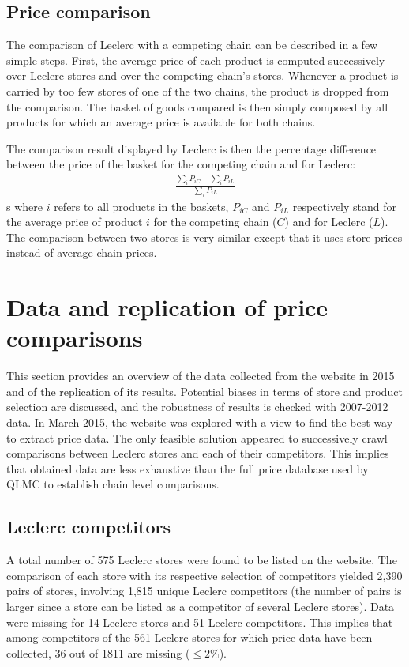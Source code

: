 \documentclass[english]{article}
\begin{document}
\subsection{Price comparison}

The comparison of Leclerc with a competing chain can be described in a few simple steps. First, the average price of each product is computed successively over Leclerc stores and over the competing chain's stores. Whenever a product is carried by too few stores of one of the two chains, the product is dropped from the comparison. The basket of goods compared is then simply composed by all products for which an average price is available for both chains.

The comparison result displayed by Leclerc is then the percentage difference between the price of the basket for the competing chain and for Leclerc:
\begin{align*}
\frac{\sum\limits_{i} P_{iC} - \sum\limits_{i} P_{iL}}{\sum\limits_{i} P_{iL}}
\end{align*}s
where $i$ refers to all products in the baskets, $P_{iC}$ and $P_{iL}$ respectively stand for the average price of product $i$ for the competing chain ($C$) and for Leclerc ($L$). The comparison between two stores is very similar except that it uses store prices instead of average chain prices.

\section{Data and replication of price comparisons}

This section provides an overview of the data collected from the website in 2015 and of the replication of its results. Potential biases in terms of store and product selection are discussed, and the robustness of results is checked with 2007-2012 data. In March 2015, the website was explored with a view to find the best way to extract price data. The only feasible solution appeared to successively crawl comparisons between Leclerc stores and each of their competitors. This implies that obtained data are less exhaustive than the full price database used by QLMC to establish chain level comparisons.

\subsection{Leclerc competitors}

A total number of 575 Leclerc stores were found to be listed on the website. The comparison of each store with its respective selection of competitors yielded 2,390 pairs of stores, involving 1,815 unique Leclerc competitors (the number of pairs is larger since a store can be listed as a competitor of several Leclerc stores). Data were missing for 14 Leclerc stores and 51 Leclerc competitors. This implies that among competitors of the 561 Leclerc stores for which price data have been collected, 36 out of 1811 are missing ($\le 2 \%$).
\end{document}
